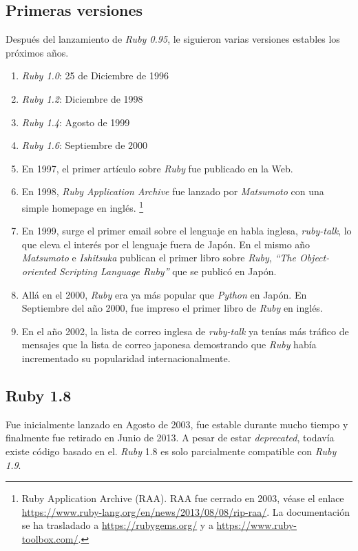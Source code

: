 \subsection{Primeras versiones}
Después del lanzamiento de \textit{Ruby 0.95}, le siguieron varias versiones estables los próximos años.
\begin{enumerate}
\item \textit{Ruby 1.0}: 25 de Diciembre de 1996
\item \textit{Ruby 1.2}: Diciembre de 1998
\item \textit{Ruby 1.4}: Agosto de 1999
\item \textit{Ruby 1.6}: Septiembre de 2000
\item En 1997, el primer artículo sobre \textit{Ruby} fue publicado en la Web.\cite{Sieger2006}
\item En 1998, \textit{Ruby Application Archive} fue lanzado por \textit{Matsumoto} con una simple homepage en inglés. \footnote{Ruby Application Archive (RAA). RAA fue cerrado en 2003, véase el enlace \url{https://www.ruby-lang.org/en/news/2013/08/08/rip-raa/}. La documentación se ha trasladado a \url{https://rubygems.org/} y a \url{https://www.ruby-toolbox.com/}.}
\item En 1999, surge el primer email sobre el lenguaje en habla inglesa, \textit{ruby-talk}, lo que eleva el interés por el lenguaje fuera de Japón. En el mismo año \textit{Matsumoto} e \textit{Ishitsuka} publican el primer libro sobre \textit{Ruby}, \textit{``The Object-oriented Scripting Language Ruby''} que se publicó en Japón.
\item Allá en el 2000, \textit{Ruby} era ya más popular que \textit{Python} en Japón. En Septiembre del año 2000, fue impreso el primer libro de \textit{Ruby} en inglés.
\item En el año 2002, la lista de correo inglesa de \textit{ruby-talk} ya tenías más tráfico de mensajes que la lista de correo japonesa demostrando que \textit{Ruby} había incrementado su popularidad internacionalmente.
\end{enumerate}


\subsection{Ruby 1.8}
Fue inicialmente lanzado en Agosto de 2003, fue estable durante mucho tiempo y finalmente fue retirado en Junio de 2013. A pesar de estar \textit{deprecated}, todavía existe código basado en el. \textit{Ruby} 1.8 es solo parcialmente compatible con \textit{Ruby 1.9}.\par

